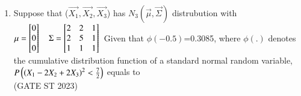 \begin{enumerate}[label=\thechapter.\arabic*,ref=\thechapter.\theenumi]
\item Suppose that ($\vec{X_1},\vec{X_2},\vec{X_3}$) has $N_3(\vec{\mu},\vec{\Sigma})$ distrubution with 
$\mu = \begin{bmatrix}
0 \\
0\\
0
\end{bmatrix} \quad  
\Sigma=\begin{bmatrix}
2 & 2 & 1 \\
2 & 5 & 1 \\
1 & 1 & 1
\end{bmatrix} \\ $ Given that $\phi(-0.5)$=0.3085, where $\phi(.)$ denotes the cumulative distribution function of a standard normal random variable, $P \left( \left(X_1-2X_2+2X_3\right)^2 < \frac{7}{2} \right)$ equals to \\
\hfill(GATE ST 2023)
\\

\end{enumerate}
